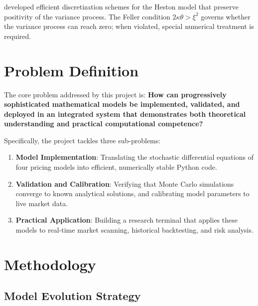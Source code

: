 \documentclass[12pt,a4paper]{article}
\begin{document}
\textcite{andersen2008} developed efficient discretization schemes for the Heston model that preserve positivity of the variance process. The Feller condition $2\kappa\theta > \xi^2$ governs whether the variance process can reach zero; when violated, special numerical treatment is required.

\section{Problem Definition}

The core problem addressed by this project is: \textbf{How can progressively sophisticated mathematical models be implemented, validated, and deployed in an integrated system that demonstrates both theoretical understanding and practical computational competence?}

Specifically, the project tackles three sub-problems:
\begin{enumerate}
\item \textbf{Model Implementation}: Translating the stochastic differential equations of four pricing models into efficient, numerically stable Python code.
\item \textbf{Validation and Calibration}: Verifying that Monte Carlo simulations converge to known analytical solutions, and calibrating model parameters to live market data.
\item \textbf{Practical Application}: Building a research terminal that applies these models to real-time market scanning, historical backtesting, and risk analysis.
\end{enumerate}

\section{Methodology}

\subsection{Model Evolution Strategy}
\end{document}
